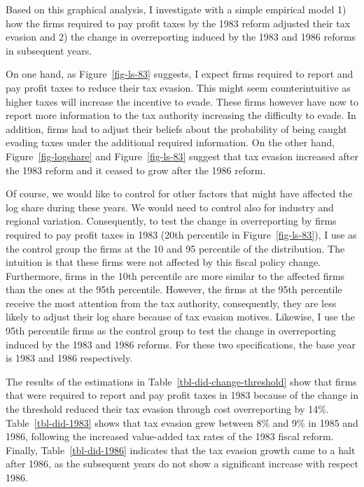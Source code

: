 \documentclass[
  12pt]{article}
\theoremstyle{definition}
\theoremstyle{remark}
\begin{document}
Based on this graphical analysis, I investigate with a simple empirical
model 1) how the firms required to pay profit taxes by the 1983 reform
adjusted their tax evasion and 2) the change in overreporting induced by
the 1983 and 1986 reforms in subsequent years.

On one hand, as Figure~\ref{fig-ls-83} suggests, I expect firms required
to report and pay profit taxes to reduce their tax evasion. This might
seem counterintuitive as higher taxes will increase the incentive to
evade. These firms however have now to report more information to the
tax authority increasing the difficulty to evade. In addition, firms had
to adjust their beliefs about the probability of being caught evading
taxes under the additional required information. On the other hand,
Figure~\ref{fig-logshare} and Figure~\ref{fig-ls-83} suggest that tax
evasion increased after the 1983 reform and it ceased to grow after the
1986 reform.

Of course, we would like to control for other factors that might have
affected the log share during these years. We would need to control also
for industry and regional variation. Consequently, to test the change in
overreporting by firms required to pay profit taxes in 1983 (20th
percentile in Figure~\ref{fig-ls-83}), I use as the control group the
firms at the 10 and 95 percentile of the distribution. The intuition is
that these firms were not affected by this fiscal policy change.
Furthermore, firms in the 10th percentile are more similar to the
affected firms than the ones at the 95th percentile. However, the firms
at the 95th percentile receive the most attention from the tax
authority, consequently, they are less likely to adjust their log share
because of tax evasion motives. Likewise, I use the 95th percentile
firms as the control group to test the change in overreporting induced
by the 1983 and 1986 reforms. For these two specifications, the base
year is 1983 and 1986 respectively.

The results of the estimations in Table~\ref{tbl-did-change-threshold}
show that firms that were required to report and pay profit taxes in
1983 because of the change in the threshold reduced their tax evasion
through cost overreporting by 14\%. Table~\ref{tbl-did-1983} shows that
tax evasion grew between 8\% and 9\% in 1985 and 1986, following the
increased value-added tax rates of the 1983 fiscal reform. Finally,
Table~\ref{tbl-did-1986} indicates that the tax evasion growth came to a
halt after 1986, as the subsequent years do not show a significant
increase with respect 1986.
\end{document}
